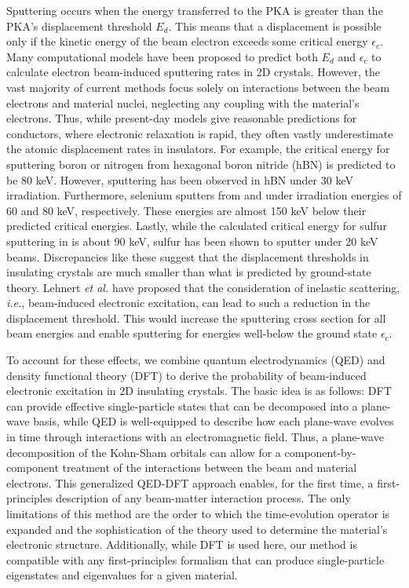 \documentclass[twoside,twocolumn,9pt]{article}
\begin{document}
Sputtering occurs when the energy transferred to the PKA is greater than
the PKA's displacement threshold $E_d$.
This means that a displacement is possible only if the kinetic energy of the
beam electron exceeds some critical energy $\epsilon_c$.
Many computational models have been proposed to predict both $E_d$ and
$\epsilon_c$ to calculate electron beam-induced sputtering rates in 2D
crystals.\cite{Meyer2012, Susi2016, Yoshimura2018, Susi2019}
However, the vast majority of current methods focus solely on interactions
between the beam electrons and material nuclei, neglecting any coupling with
the material's electrons.
Thus, while present-day models give reasonable predictions for
conductors,\cite{Meyer2012} where electronic relaxation is rapid, they often
vastly underestimate the atomic displacement rates in insulators.
For example, the critical energy for sputtering boron or nitrogen from
hexagonal boron nitride (hBN) is predicted to be 80 keV.\cite{Kotakoski2010}
However, sputtering has been observed in hBN under 30 keV
irradiation.\cite{Cretu2015}
Furthermore, selenium sputters from  and  under irradiation
energies of 60 and 80 keV, respectively.  These energies are almost 150 keV
below their predicted critical energies.\cite{Lin2015, Lehnert2017}
Lastly, while the calculated critical energy for sulfur sputtering in 
is about 90 keV, sulfur has been shown to sputter under 20 keV
beams.\cite{Kretschmer2020}
Discrepancies like these suggest that the displacement thresholds in insulating
crystals are much smaller than what is predicted by ground-state theory.
Lehnert \textit{et al.}  have proposed that the consideration of inelastic scattering,
\textit{i.e.}, beam-induced electronic excitation, can lead to such a reduction in the
displacement threshold.\cite{Lehnert2017}
This would increase the sputtering cross section for all beam energies and
enable sputtering for energies well-below the ground state $\epsilon_c$.

To account for these effects, we combine quantum electrodynamics (QED) and
density functional theory (DFT) to derive the probability of beam-induced
electronic excitation in 2D insulating crystals.
The basic idea is as follows: DFT can provide effective single-particle states
that can be decomposed into a plane-wave basis,\cite{Hohenberg1964, Kohn1965,
Kresse1996a} while QED is well-equipped to describe how each plane-wave
evolves in time through interactions with an electromagnetic
field. \cite{Lourenco-Martins2021, Peskin1995, Lancaster2014}
Thus, a plane-wave decomposition of the Kohn-Sham orbitals can allow for a
component-by-component treatment of the interactions between the beam and
material electrons.
This generalized QED-DFT approach enables, for the first time, a
first-principles description of any beam-matter interaction process.
The only limitations of this method are the order to which the time-evolution
operator is expanded and the sophistication of the theory used to determine the
material's electronic structure.
Additionally, while DFT is used here, our method is compatible with any
first-principles formalism that can produce single-particle eigenstates and
eigenvalues for a given material.
\end{document}
